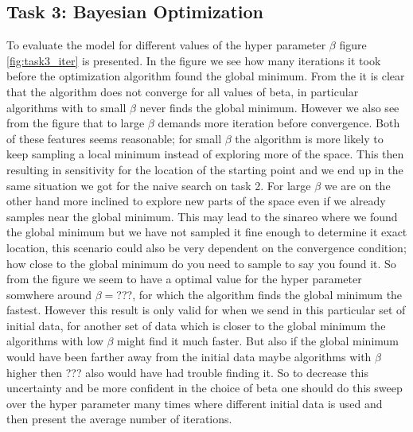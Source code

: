 \documentclass[11pt,a4paper]{article}
\begin{document}
\subsection[Task 1]{Task 3: Bayesian Optimization}
\label{sec:results_task3}
To evaluate the model for different values of the hyper parameter $\beta$ figure \ref{fig:task3_iter} is presented. In the figure we see how many iterations it took before the optimization algorithm found the global minimum. From the it is clear that the algorithm does not converge for all values of beta, in particular algorithms with to small $\beta$ never finds the global minimum. However we also see from the figure that to large $\beta$ demands more iteration before convergence. Both of these features seems reasonable; for small $\beta$ the algorithm is more likely to keep sampling a local minimum instead of exploring more of the space. This then resulting in sensitivity for the location of the starting point and we end up in the same situation we got for the naive search on task 2. For large $\beta$ we are on the other hand more inclined to explore new parts of the space even if we already samples near the global minimum. This may lead to the sinareo where we found the global minimum but we have not sampled it fine enough to determine it exact location, this scenario could also be very dependent on the convergence condition; how close to the global minimum do you need to sample to say you found it. So from the figure we seem to have a optimal value for the hyper parameter somwhere around $\beta = $???, for which the algorithm finds the global minimum the fastest. However this result is only valid for when we send in this particular set of initial data, for another set of data which is closer to the global minimum the algorithms with low $\beta$ might find it much faster. But also if the global minimum would have been farther away from the initial data maybe algorithms with $\beta$ higher then ??? also would have had trouble finding it. So to decrease this uncertainty and be more confident in the choice of beta one should do this sweep over the hyper parameter many times where different initial data is used and then present the average number of iterations.
\end{document}
